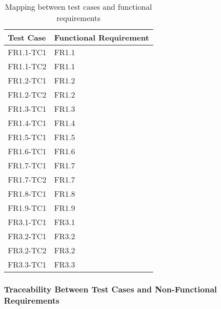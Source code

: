 \documentclass[12pt, titlepage]{article}
\begin{document}
\begin{table}[h!]
\begin{tabularx}{\textwidth}{p{5cm}p{5cm}}
\toprule {\bf Test Case} & {\bf Functional Requirement}\\
\midrule 
FR1.1-TC1 & FR1.1\\
FR1.1-TC2 & FR1.1\\
FR1.2-TC1 & FR1.2\\
FR1.2-TC2 & FR1.2\\
FR1.3-TC1 & FR1.3\\
FR1.4-TC1 & FR1.4\\
FR1.5-TC1 & FR1.5\\
FR1.6-TC1 & FR1.6\\
FR1.7-TC1 & FR1.7\\
FR1.7-TC2 & FR1.7\\
FR1.8-TC1 & FR1.8\\
FR1.9-TC1 & FR1.9\\
\midrule
FR3.1-TC1 & FR3.1\\
FR3.2-TC1 & FR3.2\\
FR3.2-TC2 & FR3.2\\
FR3.3-TC1 & FR3.3\\
\bottomrule
\end{tabularx}
\caption{Mapping between test cases and functional requirements}
\end{table}

\newpage
\subsubsection{Traceability Between Test Cases and Non-Functional Requirements}
\end{document}
